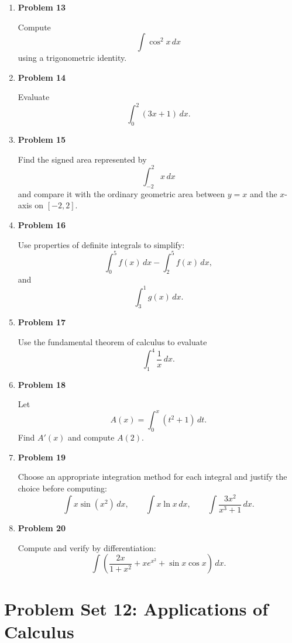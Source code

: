 \begin{enumerate}
\item \textbf{Problem 13}\par
Compute
\[
\int \cos^2 x\,dx
\]
using a trigonometric identity.

\item \textbf{Problem 14}\par
Evaluate
\[
\int_0^2 (3x+1)\,dx.
\]

\item \textbf{Problem 15}\par
Find the signed area represented by
\[
\int_{-2}^{2}x\,dx
\]
and compare it with the ordinary geometric area between \(y=x\) and the \(x\)-axis on \([-2,2]\).

\item \textbf{Problem 16}\par
Use properties of definite integrals to simplify:
\[
\int_0^5 f(x)\,dx-\int_2^5 f(x)\,dx,
\]
and
\[
\int_3^1 g(x)\,dx.
\]

\item \textbf{Problem 17}\par
Use the fundamental theorem of calculus to evaluate
\[
\int_1^4 \frac{1}{x}\,dx.
\]

\item \textbf{Problem 18}\par
Let
\[
A(x)=\int_0^x (t^2+1)\,dt.
\]
Find \(A'(x)\) and compute \(A(2)\).

\item \textbf{Problem 19}\par
Choose an appropriate integration method for each integral and justify the choice before computing:
\[
\int x\sin(x^2)\,dx,
\qquad
\int x\ln x\,dx,
\qquad
\int \frac{3x^2}{x^3+1}\,dx.
\]

\item \textbf{Problem 20}\par
Compute and verify by differentiation:
\[
\int \left(
\frac{2x}{1+x^2}
+x e^{x^2}
+\sin x\cos x
\right)\,dx.
\]
\end{enumerate}

\section{Problem Set 12: Applications of Calculus}

